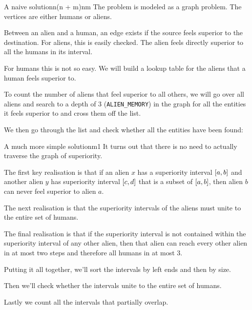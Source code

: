 \documentclass{writeup}
\begin{document}
\begin{solutions}
  \begin{solution}{A naive solution}{n(n + m)}{nm}
    The problem is modeled as a graph problem.
    The vertices are either humans or aliens.


    Between an alien and a human, an edge exists if the source feels superior to the destination.
    For aliens, this is easily checked.
    The alien feels directly superior to all the humans in its interval.


    For humans this is not so easy.
    We will build a lookup table for the aliens that a human feels superior to.


    To count the number of aliens that feel superior to all others, we will go over all aliens and search to a depth of $3$ (\texttt{ALIEN_MEMORY}) in the graph for all the entities it feels superior to and cross them off the list.


    We then go through the list and check whether all the entities have been found:

  \end{solution}

  \begin{solution}{A much more simple solution}{m}{1}
    It turns out that there is no need to actually traverse the graph of superiority.

    The first key realisation is that if an alien $x$ has a superiority interval $\interval{a}{b}$ and another alien $y$ has superiority interval $\interval{c}{d}$ that is a subset of $\interval{a}{b}$, then alien $b$ can never feel superior to alien $a$.

    The next realisation is that the superiority intervals of the aliens must unite to the entire set of humans.
    
    The final realisation is that if the superiority interval is not contained within the superiority interval of any other alien, then that alien can reach every other alien in at most two steps and therefore all humans in at most 3.

    Putting it all together, we'll sort the intervals by left ends and then by size.



    Then we'll check whether the intervals unite to the entire set of humans.


    Lastly we count all the intervals that partially overlap.

  \end{solution}
\end{solutions}
\end{document}
